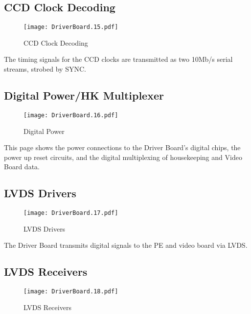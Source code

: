 \documentclass[a4paper,12pt]{article}
\begin{document}
\subsection{CCD Clock Decoding}
   \begin{figure}
   \begin{center}
   \texttt{[image: DriverBoard.15.pdf]}
   \end{center}
   \caption{CCD Clock Decoding}
   \end{figure}
   
The timing signals for the CCD clocks are transmitted as two 10Mb/s serial streams, strobed by SYNC.

\subsection{Digital Power/HK Multiplexer}
   \begin{figure}
   \begin{center}
   \texttt{[image: DriverBoard.16.pdf]}
   \end{center}
   \caption{Digital Power}
   \end{figure}

This page shows the power connections to the Driver Board's digital chips, the power up reset circuits, and the digital multiplexing of housekeeping and Video Board data.

\subsection{LVDS Drivers}
   \begin{figure}
   \begin{center}
   \texttt{[image: DriverBoard.17.pdf]}
   \end{center}
   \caption{LVDS Drivers}
   \end{figure}
 
The Driver Board transmits digital signals to the PE and video board via LVDS.

\subsection{LVDS Receivers}
   \begin{figure}
   \begin{center}
   \texttt{[image: DriverBoard.18.pdf]}
   \end{center}
   \caption{LVDS Receivers}
   \end{figure}
\end{document}
